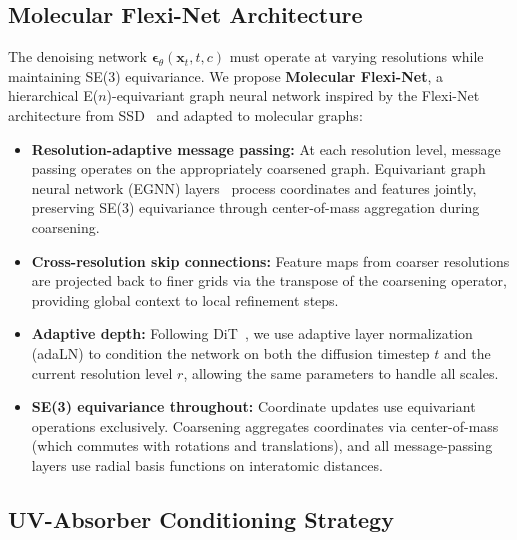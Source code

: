 \documentclass[11pt,a4paper]{article}
\newcommand{\xt}{\mathbf{x}_t}
\begin{document}
\subsection{Molecular Flexi-Net Architecture}

The denoising network $\boldsymbol{\epsilon}_\theta(\xt, t, c)$ must operate at
varying resolutions while maintaining SE(3) equivariance. We propose
\textbf{Molecular Flexi-Net}, a hierarchical E($n$)-equivariant graph neural
network inspired by the Flexi-Net architecture from SSD~\citep{ssd2026} and
adapted to molecular graphs:

\begin{itemize}[leftmargin=*]
  \item \textbf{Resolution-adaptive message passing:} At each resolution level, message
    passing operates on the appropriately coarsened graph. Equivariant graph neural
    network (EGNN) layers~\citep{satorras2021egnn} process coordinates and features
    jointly, preserving SE(3) equivariance through center-of-mass aggregation during
    coarsening.

  \item \textbf{Cross-resolution skip connections:} Feature maps from coarser resolutions
    are projected back to finer grids via the transpose of the coarsening operator,
    providing global context to local refinement steps.

  \item \textbf{Adaptive depth:} Following DiT~\citep{peebles2023dit}, we use adaptive
    layer normalization (adaLN) to condition the network on both the diffusion timestep
    $t$ and the current resolution level $r$, allowing the same parameters to handle
    all scales.

  \item \textbf{SE(3) equivariance throughout:} Coordinate updates use equivariant
    operations exclusively. Coarsening aggregates coordinates via center-of-mass (which
    commutes with rotations and translations), and all message-passing layers use
    radial basis functions on interatomic distances.
\end{itemize}

\subsection{UV-Absorber Conditioning Strategy}
\end{document}
